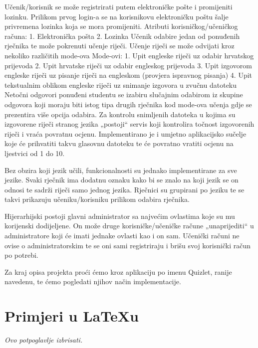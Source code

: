 Učenik/korisnik se može registrirati putem elektroničke pošte i promijeniti lozinku. Prilikom prvog login-a se na korisnikovu elektroničku poštu šalje privremena lozinka koja se mora promijeniti. 
Atributi korisničkog/učeničkog računa: 
1.	Elektronička pošta 
2.	Lozinka 
Učenik odabire jedan od ponuđenih rječnika te može pokrenuti učenje riječi. 
Učenje riječi se može odvijati kroz nekoliko različitih mode-ova
Mode-ovi:
1.	Upit engleske riječi uz odabir hrvatskog prijevoda 
2.	Upit hrvatske riječi uz odabir engleskog prijevoda
3.	Upit izgovorom engleske riječi uz pisanje riječi na engleskom (provjera ispravnog pisanja)
4.	Upit tekstualnim oblikom engleske riječi uz snimanje izgovora u zvučnu datoteku
Netočni odgovori ponuđeni studentu se izabiru slučajnim odabirom iz skupine odgovora koji moraju biti istog tipa drugih rječnika kod mode-ova učenja gdje se prezentira više opcija odabira. Za kontrolu snimljenih datoteka u kojima su izgovorene riječi stranog jezika „postoji“ servis koji kontrolira točnost izgovorenih riječi i vraća povratnu ocjenu. Implementirano je i umjetno aplikacijsko sučelje koje će prihvatiti takvu glasovnu datoteku te će povratno vratiti ocjenu na ljestvici od 1 do 10. 

Bez obzira koji jezik učili, funkcionalnosti su jednako implementirane za sve jezike. Svaki rječnik ima dodatnu oznaku kako bi se znalo na koji jezik se on odnosi te sadrži riječi samo jednog jezika. Rječnici su grupirani po jeziku te se takvi prikazuju učeniku/korisniku prilikom odabira rječnika. 

Hijerarhijski postoji glavni administrator sa najvećim ovlastima koje su mu korijenski dodijeljene. On može druge korisničke/učeničke račune „unaprijediti“ u administratore koji će imati jednake ovlasti kao i on sam. Učenički računi ne ovise o administratorskim te se oni sami registriraju i brišu svoj korisnički račun po potrebi.

Za kraj opisa projekta proći ćemo kroz aplikaciju po imenu Quizlet, ranije navedenu, te ćemo pogledati njihov način implementacije.

		\eject
		
		\section{Primjeri u \LaTeX u}
		
		\textit{Ovo potpoglavlje izbrisati.}\\

